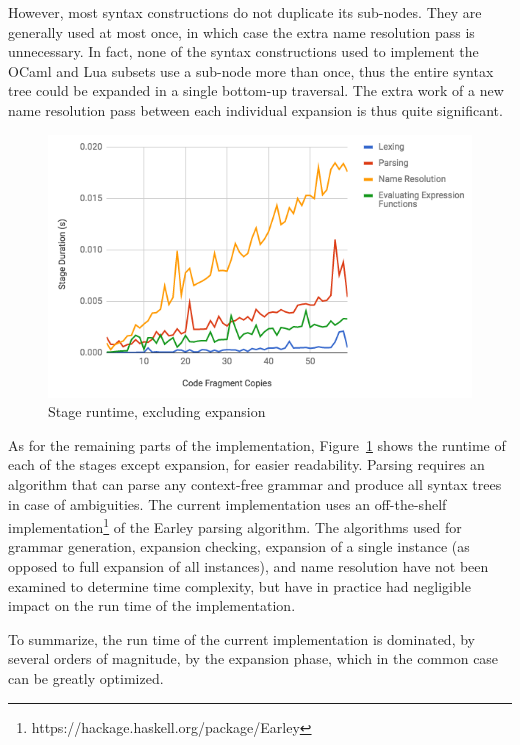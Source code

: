 \documentclass{kththesis}
\begin{document}
However, most syntax constructions do not duplicate its sub-nodes. They are generally used at most once, in which case the extra name resolution pass is unnecessary. In fact, none of the syntax constructions used to implement the OCaml and Lua subsets use a sub-node more than once, thus the entire syntax tree could be expanded in a single bottom-up traversal. The extra work of a new name resolution pass between each individual expansion is thus quite significant.

\begin{figure}[t]
\includegraphics[width=\textwidth]{resources/performance-graph-without-expansion}
\caption{Stage runtime, excluding expansion}
\label{fig:performance-graph-without-expansion}
\end{figure}

As for the remaining parts of the implementation, Figure~\ref{fig:performance-graph-without-expansion} shows the runtime of each of the stages except expansion, for easier readability. Parsing requires an algorithm that can parse any context-free grammar and produce all syntax trees in case of ambiguities. The current implementation uses an off-the-shelf implementation\footnote{https://hackage.haskell.org/package/Earley} of the Earley \cite{Earley1970An-Efficient-Co} parsing algorithm. The algorithms used for grammar generation, expansion checking, expansion of a single instance (as opposed to full expansion of all instances), and name resolution have not been examined to determine time complexity, but have in practice had negligible impact on the run time of the implementation.

To summarize, the run time of the current implementation is dominated, by several orders of magnitude, by the expansion phase, which in the common case can be greatly optimized.
\end{document}
